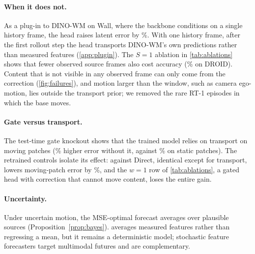 \paragraph{When it does not.} As a plug-in to DINO-WM on Wall, where the backbone conditions on a single history frame,
the head raises latent error by \dinowmWallErrInc\%. With one history frame, after the first rollout step the head
transports DINO-WM's own predictions rather than measured features (\cref{app:plugin}). The $S{=}1$ ablation in
\cref{tab:ablations} shows that fewer observed source frames also cost \ours{} accuracy (\ablsone\% on DROID). Content that is not visible in any observed frame can only come from the
correction (\cref{fig:failures}), and motion larger than the window, such as camera ego-motion, lies outside the
transport prior; we removed the rare RT-1 episodes in which the base moves.
\paragraph{Gate versus transport.} The test-time gate knockout shows that the trained model relies on transport on
moving patches (\koMoving\% higher error without it, against \koStatic\% on static patches). The retrained controls
isolate its effect: against Direct, identical except for transport, \ours{} lowers moving-patch error by
\droidMovingVsDirect\%, and the
$w{=}1$ row of \cref{tab:ablations}, a gated head with correction that cannot move content, loses the entire gain.
\paragraph{Uncertainty.} Under uncertain motion, the MSE-optimal forecast averages over plausible sources
(Proposition~\ref{prop:bayes}). \ours{} averages measured features rather than regressing a mean, but it remains a
deterministic model; stochastic feature forecasters \citep{boduljak2025vfmf,porcher2026flowwm} target multimodal
futures and are complementary.
